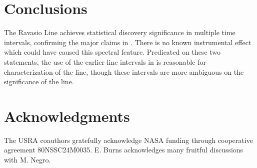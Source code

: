 \documentclass{aastex61}
\begin{document}
\section{Conclusions}
The Ravasio Line achieves statistical discovery significance in multiple time intervals, confirming the major claims in \citet{ravasio2024mega}. There is no known instrumental effect which could have caused this spectral feature. Predicated on these two statements, the use of the earlier line intervals in \citet{zhang2024observation} is reasonable for characterization of the line, though these intervals are more ambiguous on the significance of the line. 



\section*{Acknowledgments}
The USRA coauthors gratefully acknowledge NASA funding through cooperative agreement 80NSSC24M0035. E. Burns acknowledges many fruitful discussions with M. Negro.



\end{document}
